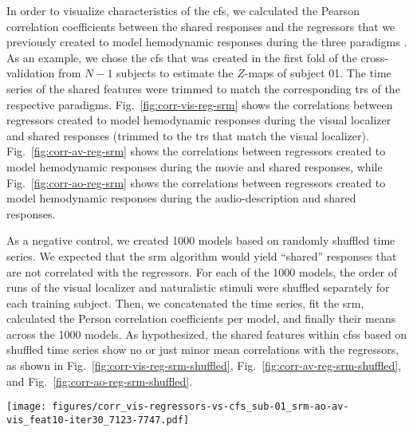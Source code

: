In order to visualize characteristics of the \ac{cfs}, we calculated the Pearson
correlation coefficients between the shared responses and the regressors that we
previously created to model hemodynamic responses during the three paradigms
\citep[cf.][]{sengupta2016extension, haeusler2022processing}.
%
As an example, we chose the \ac{cfs} that was created in the first fold of the
cross-validation from $N-1$ subjects to estimate the $Z$-maps of subject 01.
%
The time series of the shared features were trimmed to match the corresponding
\acp{tr} of the respective paradigms.
%
Fig.~\ref{fig:corr-vis-reg-srm} shows the correlations between regressors
created to model hemodynamic responses during the visual localizer and shared
responses (trimmed to the \acp{tr} that match the visual localizer).
Fig.~\ref{fig:corr-av-reg-srm} shows the correlations between regressors created
to model hemodynamic responses during the movie \citep[cf. Table 3
in][]{haeusler2022processing} and shared responses, while
Fig.~\ref{fig:corr-ao-reg-srm} shows the correlations between regressors created
to model hemodynamic responses during the audio-description \citep[cf. Table 3
in][]{haeusler2022processing} and shared responses.

As a negative control, we created 1000 models based on randomly shuffled time
series.
%
We expected that the \ac{srm} algorithm would yield ``shared'' responses that
are not correlated with the regressors.
%
For each of the 1000 models, the order of runs of the visual localizer and
naturalistic stimuli were shuffled separately for each training subject.
%
Then, we concatenated the time series, fit the \ac{srm}, calculated the Person
correlation coefficients per model, and finally their means across the 1000
models.
%
As hypothesized, the shared features within \acp{cfs} based on shuffled time
series show no or just minor mean correlations with the regressors, as shown in
%
Fig.~\ref{fig:corr-vis-reg-srm-shuffled},
%
Fig.~\ref{fig:corr-av-reg-srm-shuffled}, and
%
Fig.~\ref{fig:corr-ao-reg-srm-shuffled}.


\begin{figure*}[tbp]
\centering
\texttt{[image: figures/corr\_vis-regressors-vs-cfs\_sub-01\_srm-ao-av-vis\_feat10-iter30\_7123-7747.pdf]}
\caption{
%
\textbf{Similarity of hemodynamic responses modeled for the analysis of
    the visual localizer in \citet{sengupta2016extension} and shared features
    calculated by the shared response model (SRM) in the first
    fold of the cross-validation.}
    Before calculating the Pearson correlation coefficients plotted in the
    figure, the time series of the shared features within the multi-paradigm
    \ac{cfs} were trimmed to match the corresponding \acp{tr} of the visual
    localizer paradigm \citep{sengupta2016extension}.
    The modeled hemodynamic responses (i.e. regressors) represent predicted
    responses to the six categories of pictures that were presented in blocks.
    }
\label{fig:corr-vis-reg-srm}
\end{figure*}


